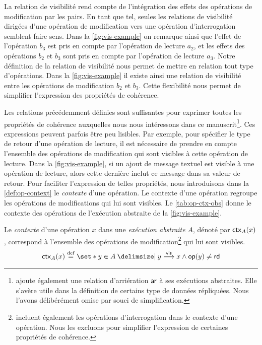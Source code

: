 La relation de visibilité rend compte de l'intégration des effets des opérations de modification par les pairs.
En tant que tel, seules les relations de visibilité dirigées d'une opération de modification vers une opération d'interrogation semblent faire sens.
Dans la \autoref{fig:vis-example} on remarque ainsi que l'effet de l'opération $b_3$ est pris en compte par l'opération de lecture $a_2$, et les effets des opérations $b_2$ et $b_3$ sont pris en compte par l'opération de lecture $a_3$.
Notre définition de la relation de visibilité nous permet de mettre en relation tout type d'opérations.
Dans la \autoref{fig:vis-example} il existe ainsi une relation de visibilité entre les opérations de modification $b_2$ et $b_3$.
Cette flexibilité nous permet de simplifier l'expression des propriétés de cohérence.

Les relations précédemment définies sont suffisantes pour exprimer toutes les propriétés de cohérence auxquelles nous nous intéressons dans ce manuscrit\footnote{\textcite{burckhardt_eventualconsistency_2014} ajoute également une relation d'arriération $\operatorname{\mathsf{ar}}$ à ses exécutions abstraites. Elle s'avère utile dans la définition de certains type de données répliquées. Nous l'avons délibérément omise par souci de simplification.}.
Ces expressions peuvent parfois être peu lisibles.
Par exemple, pour spécifier le type de retour d'une opération de lecture, il est nécessaire de prendre en compte l'ensemble des opérations de modification qui sont visibles à cette opération de lecture.
Dans la \autoref{fig:vis-example}, si un ajout de message textuel est visible à une opération de lecture, alors cette dernière inclut ce message dans sa valeur de retour.
Pour faciliter l'expression de telles propriétés, nous introduisons dans la \autoref{def:op-context} le \emph{contexte} d'une opération.
Le contexte d'une opération regroupe les opérations de modifications qui lui sont visibles.
Le \autoref{tab:op-ctx-obs} donne le contexte des opérations de l'exécution abstraite de la \autoref{fig:vis-example}.

\begin{definition}[Contexte]\label{def:op-context}
Le \emph{contexte} d'une opération $x$ dans une \emph{exécution abstraite} $A$, dénoté par $\operatorname{\mathsf{ctx}}_A(x)$, correspond à l'ensemble des opérations de modification\footnote{\textcite{burckhardt_eventualconsistency_2014,viotti_consistency_2016} incluent également les opérations d'interrogation dans le contexte d'une opération. Nous les excluons pour simplifier l'expression de certaines propriétés de cohérence.} qui lui sont visibles.
\begin{equation*}
    \trm{ctx}_A(x) \defeq \set*{y \in A \given y \vis x \land \trm{op}(y) \neq \trm{rd}}
\end{equation*}
\end{definition}

